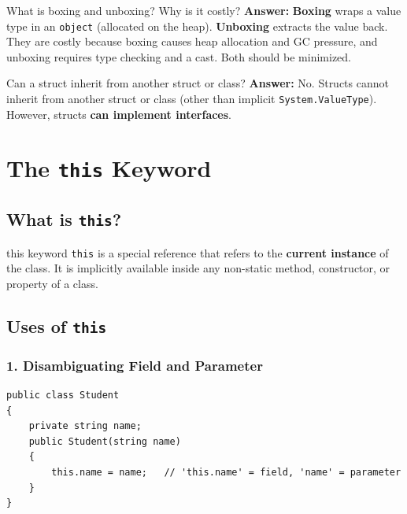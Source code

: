 \documentclass[11pt,a4paper]{article}
\begin{document}
\begin{intqBox}{What is boxing and unboxing? Why is it costly?}
\textbf{Answer:} \textbf{Boxing} wraps a value type in an \texttt{object} (allocated on the heap). \textbf{Unboxing} extracts the value back. They are costly because boxing causes heap allocation and GC pressure, and unboxing requires type checking and a cast. Both should be minimized.
\end{intqBox}

\begin{intqBox}{Can a struct inherit from another struct or class?}
\textbf{Answer:} No. Structs cannot inherit from another struct or class (other than implicit \texttt{System.ValueType}). However, structs \textbf{can implement interfaces}.
\end{intqBox}

\clearpage
\section{The \texttt{this} Keyword}

\subsection{What is \texttt{this}?}

\begin{defnBox}{this keyword}
\texttt{this} is a special reference that refers to the \textbf{current instance} of the class. It is implicitly available inside any non-static method, constructor, or property of a class.
\end{defnBox}

\subsection{Uses of \texttt{this}}

\subsubsection{1. Disambiguating Field and Parameter}

\begin{lstlisting}
public class Student
{
    private string name;
    public Student(string name)
    {
        this.name = name;   // 'this.name' = field, 'name' = parameter
    }
}
\end{lstlisting}
\end{document}

